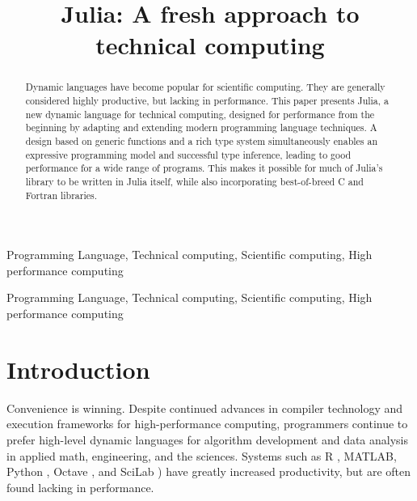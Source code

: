 \documentclass[9pt]{sigplanconf}
\begin{document}


\title{Julia: A fresh approach to technical computing}


\maketitle
\begin{abstract}
  Dynamic languages have become popular for scientific
  computing. They are generally considered highly productive, but
  lacking in performance. This paper presents Julia, a new dynamic
  language for technical computing, designed for performance from the
  beginning by adapting and extending modern programming language
  techniques. A design based on generic functions and a rich type
  system simultaneously enables an expressive programming model and
  successful type inference, leading to good performance for a wide
  range of programs. This makes it possible for much of Julia's
  library to be written in Julia itself, while also incorporating
  best-of-breed C and Fortran libraries.
\end{abstract}


\terms
Programming Language, Technical computing, Scientific computing, High
performance computing

\keywords
Programming Language, Technical computing, Scientific computing, High
performance computing

\section{Introduction}

Convenience is winning. Despite continued advances in compiler
technology and execution frameworks for high-performance computing,
programmers continue to prefer high-level dynamic languages for
algorithm development and data analysis in applied math, engineering,
and the sciences. Systems such as R \cite{Rlang},
MATLAB\textregistered, Python\cite{numpy} , Octave \cite{Octave}, and
SciLab \cite{scilab}) have greatly increased productivity, but are
often found lacking in performance.
\end{document}
